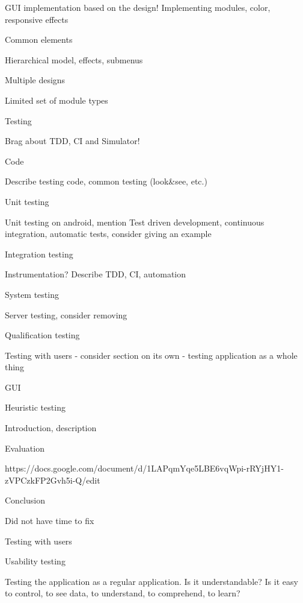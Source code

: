 GUI implementation based on the design! Implementing modules, color, responsive effects

\secc Common elements

Hierarchical model, effects, submenus

\secc Multiple designs

Limited set of module types

\chap Testing

Brag about TDD, CI and Simulator!

\sec Code

Describe testing code, common testing (look&see, etc.)

\secc Unit testing

Unit testing on android, mention Test driven development, continuous integration, automatic tests, consider giving an example

\secc Integration testing

Instrumentation? Describe TDD, CI, automation

\secc System testing

Server testing, consider removing

\secc Qualification testing

Testing with users - consider section on its own - testing application as a whole thing

\sec GUI


\secc Heuristic testing

Introduction, description

\seccc Evaluation

https://docs.google.com/document/d/1LAPqmYqe5LBE6vqWpi-rRYjHY1-zVPCzkFP2Gvh5i-Q/edit

\seccc Conclusion

Did not have time to fix

\secc Testing with users


\seccc Usability testing

Testing the application as a regular application. Is it understandable? Is it easy to control, to see data, to understand, to comprehend, to learn?


